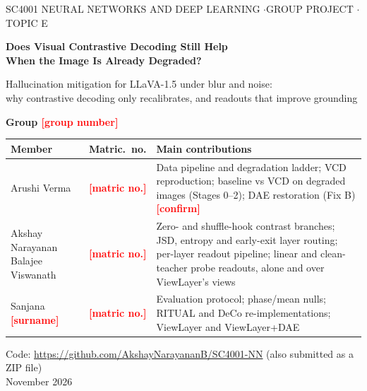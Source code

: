 \documentclass[10pt,a4paper]{article}
\newcommand{\todo}[1]{\textcolor{red}{\textbf{[#1]}}}       %
\newcommand{\ours}{ViewLayer}
\begin{document}
\begin{titlepage}
\pagestyle{empty}
\setlength{\parindent}{0pt}
\raggedright
\vspace*{2.2cm}
{\color{ink2}\small SC4001 NEURAL NETWORKS AND DEEP LEARNING \quad$\cdot$\quad GROUP PROJECT \quad$\cdot$\quad TOPIC E}\par
\vspace{0.5cm}
{\fontsize{22}{27}\selectfont\bfseries Does Visual Contrastive Decoding Still Help\\[2pt] When the Image Is Already Degraded?\par}
\vspace{0.4cm}
{\large\color{ink2} Hallucination mitigation for LLaVA-1.5 under blur and noise:\\ why contrastive decoding only recalibrates, and readouts that improve grounding\par}
\vspace{1.4cm}
{\large\bfseries Group \todo{group number}\par}
\vspace{0.4cm}
{\small
\begin{tabularx}{\textwidth}{@{}>{\raggedright\arraybackslash}p{4.4cm}>{\raggedright\arraybackslash}p{2.4cm}>{\raggedright\arraybackslash}X@{}}
\toprule
\textbf{Member} & \textbf{Matric.\ no.} & \textbf{Main contributions}\\
\midrule
Arushi Verma & \todo{matric no.} & Data pipeline and degradation ladder; VCD reproduction; baseline vs VCD on degraded images (Stages 0--2); DAE restoration (Fix B) \todo{confirm}\\[2pt]
Akshay Narayanan Balajee Viswanath & \todo{matric no.} & Zero- and shuffle-hook contrast branches; JSD, entropy and early-exit layer routing; per-layer readout pipeline; linear and clean-teacher probe readouts, alone and over \ours's views\\[2pt]
Sanjana \todo{surname} & \todo{matric no.} & Evaluation protocol; phase/mean nulls; RITUAL and DeCo re-implementations; \ours{} and \ours+DAE\\
\bottomrule
\end{tabularx}}
\vfill
{\small\color{ink2}
Code: \url{https://github.com/AkshayNarayananB/SC4001-NN} (also submitted as a ZIP file)\\
November 2026\par}
\end{titlepage}
\end{document}
